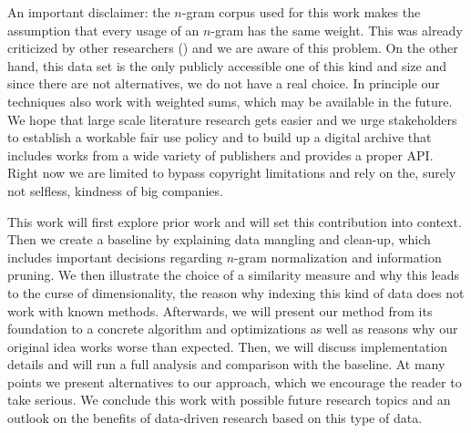An important disclaimer: the $n$-gram corpus used for this work makes the assumption that every usage of an $n$-gram has the same weight. This was already criticized by other researchers (\cite{countbad}) and we are aware of this problem. On the other hand, this data set is the only publicly accessible one of this kind and size and since there are not alternatives, we do not have a real choice. In principle our techniques also work with weighted sums, which may be available in the future. We hope that large scale literature research gets easier and we urge stakeholders to establish a workable fair use policy and to build up a digital archive that includes works from a wide variety of publishers and provides a proper API\@. Right now we are limited to bypass copyright limitations and rely on the, surely not selfless, kindness of big companies.

This work will first explore prior work and will set this contribution into context. Then we create a baseline by explaining data mangling and clean-up, which includes important decisions regarding $n$-gram normalization and information pruning. We then illustrate the choice of a similarity measure and why this leads to the curse of dimensionality, the reason why indexing this kind of data does not work with known methods. Afterwards, we will present our method from its foundation to a concrete algorithm and optimizations as well as reasons why our original idea works worse than expected. Then, we will discuss implementation details and will run a full analysis and comparison with the baseline. At many points we present alternatives to our approach, which we encourage the reader to take serious. We conclude this work with possible future research topics and an outlook on the benefits of data-driven research based on this type of data.
